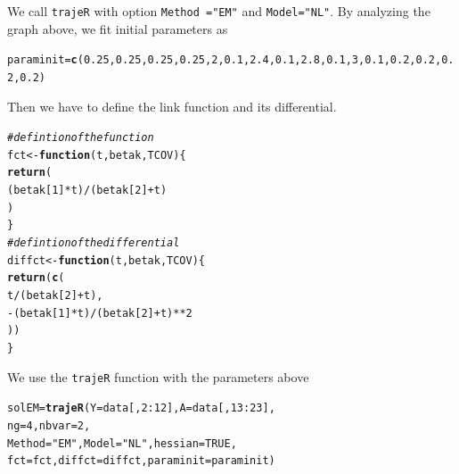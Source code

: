\documentclass{article}\usepackage[]{graphicx}\usepackage[]{color}
\makeatletter
\newcommand{\hlnum}[1]{\textcolor[rgb]{0.686,0.059,0.569}{#1}}%
\newcommand{\hlstr}[1]{\textcolor[rgb]{0.192,0.494,0.8}{#1}}%
\newcommand{\hlcom}[1]{\textcolor[rgb]{0.678,0.584,0.686}{\textit{#1}}}%
\newcommand{\hlopt}[1]{\textcolor[rgb]{0,0,0}{#1}}%
\newcommand{\hlstd}[1]{\textcolor[rgb]{0.345,0.345,0.345}{#1}}%
\newcommand{\hlkwa}[1]{\textcolor[rgb]{0.161,0.373,0.58}{\textbf{#1}}}%
\newcommand{\hlkwb}[1]{\textcolor[rgb]{0.69,0.353,0.396}{#1}}%
\newcommand{\hlkwc}[1]{\textcolor[rgb]{0.333,0.667,0.333}{#1}}%
\newcommand{\hlkwd}[1]{\textcolor[rgb]{0.737,0.353,0.396}{\textbf{#1}}}%
\newenvironment{kframe}{%
 \def\at@end@of@kframe{}%
 \ifinner\ifhmode%
  \def\at@end@of@kframe{\end{minipage}}%
  \begin{minipage}{\columnwidth}%
 \fi\fi%
 \def\FrameCommand##1{\hskip\@totalleftmargin \hskip-\fboxsep
 \colorbox{shadecolor}{##1}\hskip-\fboxsep
     \hskip-\linewidth \hskip-\@totalleftmargin \hskip\columnwidth}%
 \MakeFramed {\advance\hsize-\width
   \@totalleftmargin\z@ \linewidth\hsize
   \@setminipage}}%
 {\par\unskip\endMakeFramed%
 \at@end@of@kframe}
\newenvironment{knitrout}{}{} %
\makeatother
\begin{document}
We call \verb|trajeR| with option \verb|Method ="EM"| and \verb|Model="NL"|. By analyzing the graph above, we fit initial parameters as
\begin{knitrout}
\color{fgcolor}\begin{kframe}
\begin{alltt}
\hlstd{paraminit}\hlkwb{=}\hlkwd{c}\hlstd{(}\hlnum{0.25}\hlstd{,}\hlnum{0.25}\hlstd{,}\hlnum{0.25}\hlstd{,}\hlnum{0.25}\hlstd{,}\hlnum{2}\hlstd{,}\hlnum{0.1}\hlstd{,}\hlnum{2.4}\hlstd{,}\hlnum{0.1}\hlstd{,}\hlnum{2.8}\hlstd{,}\hlnum{0.1}\hlstd{,}\hlnum{3}\hlstd{,}\hlnum{0.1}\hlstd{,}\hlnum{0.2}\hlstd{,}\hlnum{0.2}\hlstd{,}\hlnum{0.2}\hlstd{,}\hlnum{0.2}\hlstd{)}
\end{alltt}
\end{kframe}
\end{knitrout}
Then we have to define the link function and its differential.
\begin{knitrout}
\color{fgcolor}\begin{kframe}
\begin{alltt}
\hlcom{#defintion of the function}
\hlstd{fct} \hlkwb{<-} \hlkwa{function}\hlstd{(}\hlkwc{t}\hlstd{,} \hlkwc{betak}\hlstd{,} \hlkwc{TCOV}\hlstd{)\{}
  \hlkwd{return}\hlstd{(}
    \hlstd{(betak[}\hlnum{1}\hlstd{]}\hlopt{*}\hlstd{t)}\hlopt{/}\hlstd{(betak[}\hlnum{2}\hlstd{]}\hlopt{+}\hlstd{t)}
  \hlstd{)}
\hlstd{\}}
\hlcom{#defintion of the differential}
\hlstd{diffct} \hlkwb{<-} \hlkwa{function}\hlstd{(}\hlkwc{t}\hlstd{,} \hlkwc{betak}\hlstd{,} \hlkwc{TCOV}\hlstd{)\{}
  \hlkwd{return}\hlstd{(}\hlkwd{c}\hlstd{(}
    \hlstd{t}\hlopt{/}\hlstd{(betak[}\hlnum{2}\hlstd{]}\hlopt{+}\hlstd{t),}
    \hlopt{-}\hlstd{(betak[}\hlnum{1}\hlstd{]}\hlopt{*}\hlstd{t)}\hlopt{/}\hlstd{(betak[}\hlnum{2}\hlstd{]}\hlopt{+}\hlstd{t)}\hlopt{**}\hlnum{2}
  \hlstd{))}
\hlstd{\}}
\end{alltt}
\end{kframe}
\end{knitrout}
We use the \verb|trajeR| function with the parameters above
\begin{knitrout}
\color{fgcolor}\begin{kframe}
\begin{alltt}
\hlstd{solEM} \hlkwb{=} \hlkwd{trajeR}\hlstd{(}\hlkwc{Y} \hlstd{= data[,}\hlnum{2}\hlopt{:}\hlnum{12}\hlstd{],} \hlkwc{A} \hlstd{= data[,}\hlnum{13}\hlopt{:}\hlnum{23}\hlstd{],}
               \hlkwc{ng} \hlstd{=} \hlnum{4}\hlstd{,} \hlkwc{nbvar} \hlstd{=} \hlnum{2}\hlstd{,}
               \hlkwc{Method} \hlstd{=} \hlstr{"EM"}\hlstd{,} \hlkwc{Model} \hlstd{=} \hlstr{"NL"}\hlstd{,} \hlkwc{hessian} \hlstd{=} \hlnum{TRUE}\hlstd{,}
               \hlkwc{fct} \hlstd{= fct,} \hlkwc{diffct} \hlstd{= diffct,} \hlkwc{paraminit} \hlstd{= paraminit)}
\end{alltt}
\end{kframe}
\end{knitrout}
\end{document}
